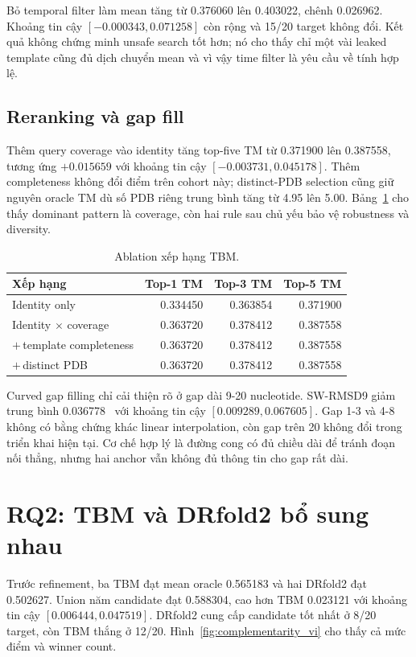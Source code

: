 \documentclass[12pt,a4paper,oneside]{report}
\newcommand{\angstrom}{\text{\AA}}
\begin{document}
Bỏ temporal filter làm mean tăng từ 0.376060 lên 0.403022, chênh 0.026962. Khoảng tin
cậy $[-0.000343,0.071258]$ còn rộng và 15/20 target không đổi. Kết quả không chứng minh
unsafe search tốt hơn; nó cho thấy chỉ một vài leaked template cũng đủ dịch chuyển mean
và vì vậy time filter là yêu cầu về tính hợp lệ.

\subsection{Reranking và gap fill}

Thêm query coverage vào identity tăng top-five TM từ 0.371900 lên 0.387558, tương ứng
$+0.015659$ với khoảng tin cậy $[-0.003731,0.045178]$. Thêm completeness không đổi
điểm trên cohort này; distinct-PDB selection cũng giữ nguyên oracle TM dù số PDB riêng
trung bình tăng từ 4.95 lên 5.00. Bảng~\ref{tab:tbm_rerank_vi} cho thấy dominant pattern
là coverage, còn hai rule sau chủ yếu bảo vệ robustness và diversity.

\begin{table}[H]
\centering
\caption{Ablation xếp hạng TBM.}
\label{tab:tbm_rerank_vi}
\begin{tabular}{lrrr}
\toprule
Xếp hạng & Top-1 TM & Top-3 TM & Top-5 TM \\
\midrule
Identity only & 0.334450 & 0.363854 & 0.371900 \\
Identity $\times$ coverage & 0.363720 & 0.378412 & 0.387558 \\
$+\,$template completeness & 0.363720 & 0.378412 & 0.387558 \\
$+\,$distinct PDB & 0.363720 & 0.378412 & 0.387558 \\
\bottomrule
\end{tabular}
\end{table}

Curved gap filling chỉ cải thiện rõ ở gap dài 9-20 nucleotide. SW-RMSD9 giảm trung bình
0.036778~\angstrom{} với khoảng tin cậy $[0.009289,0.067605]$. Gap 1-3 và 4-8 không có
bằng chứng khác linear interpolation, còn gap trên 20 không đổi trong triển khai hiện
tại. Cơ chế hợp lý là đường cong có đủ chiều dài để tránh đoạn nối thẳng, nhưng hai
anchor vẫn không đủ thông tin cho gap rất dài.

\section{RQ2: TBM và DRfold2 bổ sung nhau}

Trước refinement, ba TBM đạt mean oracle 0.565183 và hai DRfold2 đạt 0.502627. Union năm
candidate đạt 0.588304, cao hơn TBM 0.023121 với khoảng tin cậy
$[0.006444,0.047519]$. DRfold2 cung cấp candidate tốt nhất ở 8/20 target, còn TBM thắng
ở 12/20. Hình~\ref{fig:complementarity_vi} cho thấy cả mức điểm và winner count.
\end{document}
